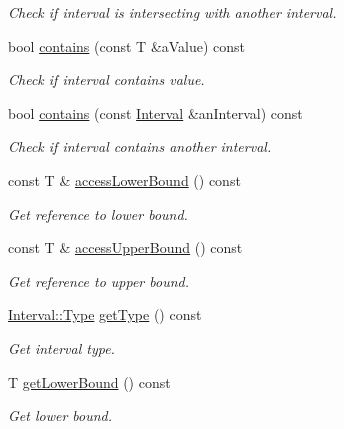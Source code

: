\begin{DoxyCompactItemize}
\begin{DoxyCompactList}\small\item\em Check if interval is intersecting with another interval. \end{DoxyCompactList}\item 
bool \hyperlink{classostk_1_1math_1_1obj_1_1_interval_a78acbb2eb10761ffd0f0d6198391a3fa}{contains} (const T \&a\+Value) const
\begin{DoxyCompactList}\small\item\em Check if interval contains value. \end{DoxyCompactList}\item 
bool \hyperlink{classostk_1_1math_1_1obj_1_1_interval_ad7d805288e161a123593991f90c437ff}{contains} (const \hyperlink{classostk_1_1math_1_1obj_1_1_interval}{Interval} \&an\+Interval) const
\begin{DoxyCompactList}\small\item\em Check if interval contains another interval. \end{DoxyCompactList}\item 
const T \& \hyperlink{classostk_1_1math_1_1obj_1_1_interval_ae2c364698fdfffb5b475da8c601c2ef9}{access\+Lower\+Bound} () const
\begin{DoxyCompactList}\small\item\em Get reference to lower bound. \end{DoxyCompactList}\item 
const T \& \hyperlink{classostk_1_1math_1_1obj_1_1_interval_a331c854897280447909268984716c7b2}{access\+Upper\+Bound} () const
\begin{DoxyCompactList}\small\item\em Get reference to upper bound. \end{DoxyCompactList}\item 
\hyperlink{classostk_1_1math_1_1obj_1_1_interval_base_a0dd9bd29a9bfefa26de9b88ac81de92a}{Interval\+::\+Type} \hyperlink{classostk_1_1math_1_1obj_1_1_interval_a57317128be5c1e7c4adb798149154d18}{get\+Type} () const
\begin{DoxyCompactList}\small\item\em Get interval type. \end{DoxyCompactList}\item 
T \hyperlink{classostk_1_1math_1_1obj_1_1_interval_ab6b044772238c2f66072377e4e6f7f25}{get\+Lower\+Bound} () const
\begin{DoxyCompactList}\small\item\em Get lower bound. \end{DoxyCompactList}\item 

\end{DoxyCompactItemize}

